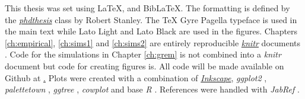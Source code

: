 This thesis was set using \LaTeX, \XeLaTeX\vspace{1mm} and Bib\LaTeX. \vspace{-0.12cm} 
The formatting is defined by the \href{https://github.com/robjstan/latex-phdthesis}{\emph{phdthesis}} class by Robert Stanley.
The TeX Gyre Pagella typeface is used in the main text while { Lato Light} and { \color[rgb]{0.75,0.75,0.75} Lato Black} are used in the figures.
Chapters \ref{ch:empirical}, \ref{ch:sims1} and \ref{ch:sims2} are entirely reproducible \href{http://yihui.name/knitr/}{\emph{knitr}} documents \cite{knitr}.
Code for the simulations in Chapter \ref{ch:grem} is not combined into a \emph{knitr} document but code for creating figures is.
All code will be made available on Github at \href{https://github.com/timcdlucas/PhDThesis}. %
Plots were created with a combination of \href{www.inkscape.org}{\emph{Inkscape}}, \emph{ggplot2} \cite{ggplot2}, \emph{palettetown} \cite{palettetown}, \emph{ggtree} \cite{ggtree}, \emph{cowplot} \cite{cowplot} and base \emph{R} \cite{R}.
References were handled with \emph{JabRef} \cite{JabRef_software}. 

